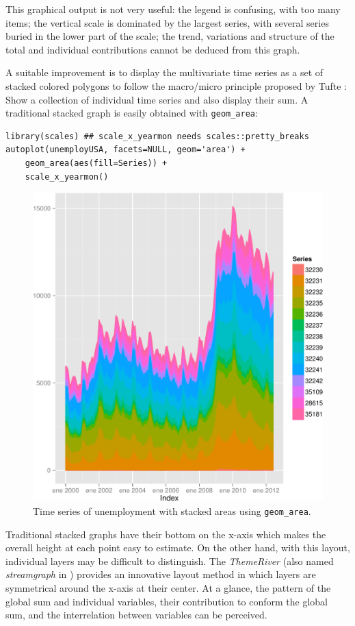 \documentclass[smallroyalvopaper]{memoir}
\begin{document}
This graphical output is not very useful: the legend is confusing,
with too many items; the vertical scale is dominated by the largest
series, with several series buried in the lower part of the scale; the
trend, variations and structure of the total and individual
contributions cannot be deduced from this graph.

A suitable improvement is to display the multivariate time series as a
set of stacked colored polygons to follow the macro/micro principle
proposed by Tufte \cite{Tufte1990}: Show a collection of individual
time series and also display their sum. A traditional stacked graph is
easily obtained with \texttt{geom\_area}:
\lstset{language=R,numbers=none}
\begin{lstlisting}
library(scales) ## scale_x_yearmon needs scales::pretty_breaks
autoplot(unemployUSA, facets=NULL, geom='area') +
    geom_area(aes(fill=Series)) +
    scale_x_yearmon()
\end{lstlisting}

\begin{figure}[htb]
\centering
\includegraphics[width=.9\linewidth]{figs/unemployUSAgeomArea.pdf}
\caption{\label{fig:unemployUSAgeomArea}Time series of unemployment with stacked areas using \texttt{geom\_area}.}
\end{figure}

Traditional stacked graphs have their bottom on the x-axis which makes
the overall height at each point easy to estimate. On the other hand,
with this layout, individual layers may be difficult to
distinguish. The \emph{ThemeRiver} \cite{Havre.Hetzler.ea2002} (also named
\emph{streamgraph} in \cite{Byron.Wattenberg2008}) provides an innovative
layout method in which layers are symmetrical around the x-axis at
their center. At a glance, the pattern of the global sum and
individual variables, their contribution to conform the global sum,
and the interrelation between variables can be perceived.
\end{document}
